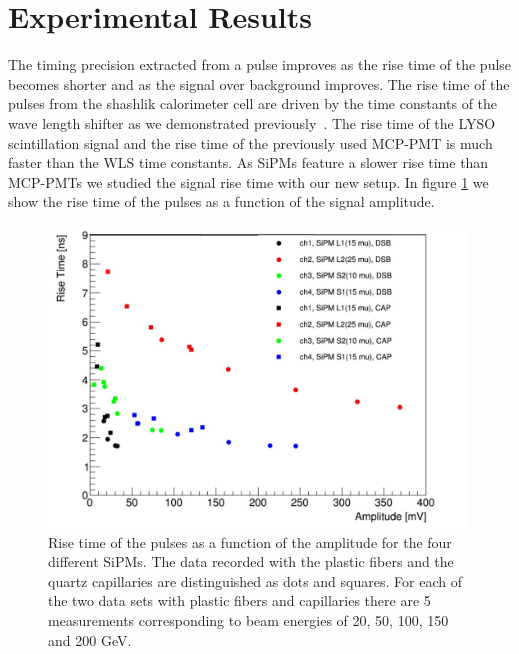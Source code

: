 \section{Experimental Results}
The timing precision extracted from a pulse improves as the rise time of the pulse becomes shorter and as the signal over background 
improves. The rise time of the pulses from the shashlik calorimeter cell are driven by the time constants of the wave length shifter
as we demonstrated previously~\cite{lysotiming}. The rise time of the LYSO scintillation signal and the rise time of the previously 
used MCP-PMT is much faster than the WLS time constants. As SiPMs feature a slower rise time than MCP-PMTs we studied the signal 
rise time with our new setup. In figure \ref{RiseTime} we show the rise time of the pulses as a function of the signal amplitude. 
%
\begin{figure}[htbc]
\includegraphics[width=0.99\textwidth]{RiseTime.pdf}
\caption{\label{RiseTime}Rise time of the pulses as a function of the amplitude for the four different SiPMs.
 The data recorded with the plastic fibers and the quartz capillaries are distinguished as dots and squares. For each of the two data 
sets with plastic fibers and capillaries there are 5 measurements corresponding to beam energies of 20, 50, 100, 150 and 200 GeV.}
\end{figure}
